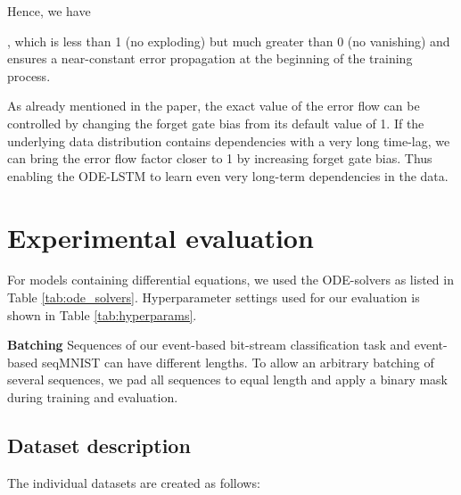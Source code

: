 \documentclass{article}
\begin{document}
Hence, we have 

,  which is less than 1 (no exploding) but much greater than 0 (no vanishing) and 
ensures a near-constant error propagation at the beginning of the training process.

As already mentioned in the paper, the exact value of the error flow can be controlled by changing the forget gate bias from its default value of 1.
If the underlying data distribution contains dependencies with a very long time-lag, we can bring the error flow factor closer to 1 by increasing forget gate bias. Thus enabling the ODE-LSTM to learn even very long-term dependencies in the data.

\section{Experimental evaluation}
For models containing differential equations, we used the ODE-solvers as listed in Table \ref{tab:ode_solvers}. Hyperparameter settings used for our evaluation is shown in Table \ref{tab:hyperparams}. 

\textbf{Batching}
Sequences of our event-based bit-stream classification task and event-based seqMNIST can have different lengths.
To allow an arbitrary batching of several sequences, we pad all sequences to equal length and apply a binary mask during training and evaluation.

\subsection{Dataset description}
The individual datasets are created as follows:
\end{document}
